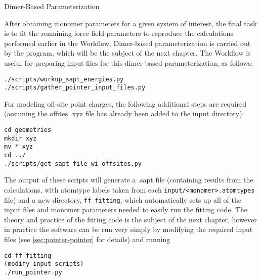 \begin{section}{Dimer-Based Parameterization}
\label{sec:workflow-dimer_parameters}

After obtaining monomer parameters for a given system of interest, the final
task is to fit the remaining force field parameters to reproduce the
\dftsapt calculations performed earlier in the Workflow. Dimer-based
parameterization is carried out by the \pointer program, which will be the
subject of the next chapter. The Workflow is useful for preparing input
files for this dimer-based parameterization, as follows:
%
\begin{lstlisting}
./scripts/workup_sapt_energies.py
./scripts/gather_pointer_input_files.py
\end{lstlisting}
%
For modeling off-site point charges, the following additional steps are
required (assuming the offites .xyz file has already been added to the input
directory):
\begin{lstlisting}
cd geometries
mkdir xyz
mv * xyz
cd ../
./scripts/get_sapt_file_wi_offsites.py
\end{lstlisting}
%
The output of these scripts will generate a .sapt file (containing results
from the \dftsapt calculations, with atomtype
labels taken from each \verb|input/<monomer>.atomtypes| file) and a new
directory, \verb|ff_fitting|, which automatically sets up all of the input files and monomer
parameters needed to easily run the \pointer fitting code. The theory and
practice of the \pointer fitting code is the subject of the next chapter,
however in practice the software can be run very simply by modifying the
required input files (see \cref{sec:pointer-pointer} for details) and running
\begin{lstlisting}
cd ff_fitting
(modify input scripts)
./run_pointer.py
\end{lstlisting}

\end{section}

